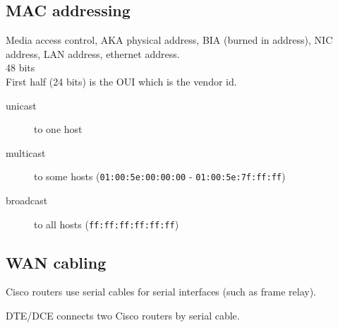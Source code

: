 \subsection{MAC addressing}

Media access control, AKA physical address, BIA (burned in address), NIC
address, LAN address, ethernet address.\\

48 bits\\

First half (24 bits) is the OUI which is the vendor id.

\begin {description}

\item[unicast]
to one host

\item[multicast]
to some hosts (\texttt{01:00:5e:00:00:00} - \texttt{01:00:5e:7f:ff:ff})

\item[broadcast]
to all hosts (\texttt{ff:ff:ff:ff:ff:ff})

\end{description}

\subsection{WAN cabling}

Cisco routers use serial cables for serial interfaces (such as frame relay).

DTE/DCE connects two Cisco routers by serial cable.

